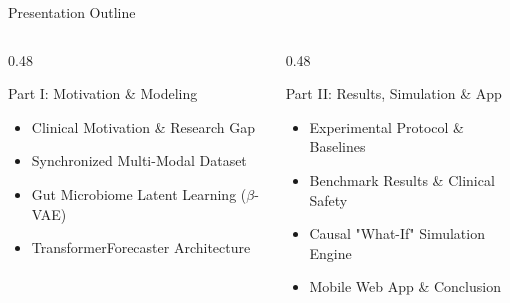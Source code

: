 \documentclass[aspectratio=169, 10pt]{beamer}
\begin{document}
\begin{frame}{Presentation Outline}
  \begin{columns}[c]
    \begin{column}{0.48\textwidth}
      \begin{block}{Part I: Motivation \& Modeling}
        \begin{itemize}\setlength{\itemsep}{0.6em}
          \item Clinical Motivation \& Research Gap
          \item Synchronized Multi-Modal Dataset
          \item Gut Microbiome Latent Learning ($\beta$-VAE)
          \item TransformerForecaster Architecture
        \end{itemize}
      \end{block}
    \end{column}
    
    \begin{column}{0.48\textwidth}
      \begin{block}{Part II: Results, Simulation \& App}
        \begin{itemize}\setlength{\itemsep}{0.6em}
          \item Experimental Protocol \& Baselines
          \item Benchmark Results \& Clinical Safety
          \item Causal "What-If" Simulation Engine
          \item Mobile Web App \& Conclusion
        \end{itemize}
      \end{block}
    \end{column}
  \end{columns}
\end{frame}
\end{document}
